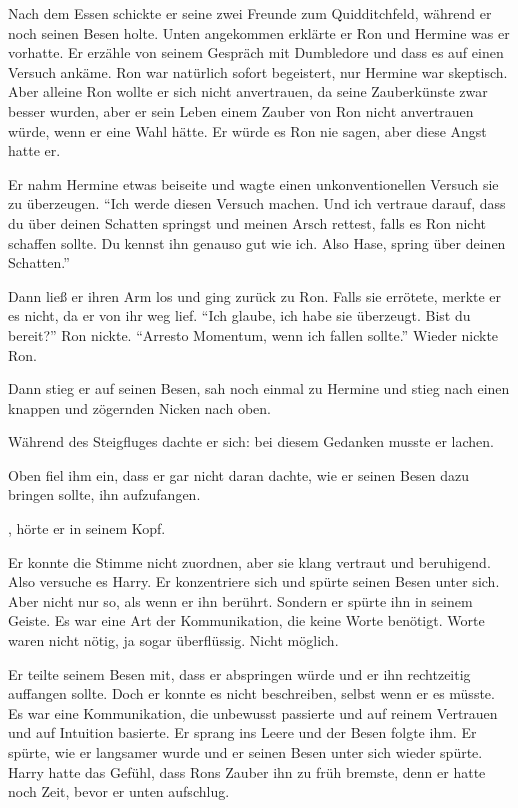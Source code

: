 Nach dem Essen schickte er seine zwei Freunde zum Quidditchfeld, während er noch seinen Besen holte. Unten angekommen erklärte er Ron und Hermine was er vorhatte. Er erzähle von seinem Gespräch mit Dumbledore und dass es auf einen Versuch ankäme. Ron war natürlich sofort begeistert, nur Hermine war skeptisch. Aber alleine Ron wollte er sich nicht anvertrauen, da seine Zauberkünste zwar besser wurden, aber er sein Leben einem Zauber von Ron nicht anvertrauen würde, wenn er eine Wahl hätte. Er würde es Ron nie sagen, aber diese Angst hatte er.

Er nahm Hermine etwas beiseite und wagte einen unkonventionellen Versuch sie zu überzeugen. \enquote{Ich werde diesen Versuch machen. Und ich vertraue darauf, dass du über deinen Schatten springst und meinen Arsch rettest, falls es Ron nicht schaffen sollte. Du kennst ihn genauso gut wie ich. Also Hase, spring über deinen Schatten.}

Dann ließ er ihren Arm los und ging zurück zu Ron. Falls sie errötete, merkte er es nicht, da er von ihr weg lief. \enquote{Ich glaube, ich habe sie überzeugt. Bist du bereit?} Ron nickte. \enquote{Arresto Momentum, wenn ich fallen sollte.} Wieder nickte Ron.

Dann stieg er auf seinen Besen, sah noch einmal zu Hermine und stieg nach einen knappen und zögernden Nicken nach oben.

Während des Steigfluges dachte er sich:  bei diesem Gedanken musste er lachen. 

Oben fiel ihm ein, dass er gar nicht daran dachte, wie er seinen Besen dazu bringen sollte, ihn aufzufangen.

, hörte er in seinem Kopf.

Er konnte die Stimme nicht zuordnen, aber sie klang vertraut und beruhigend. Also versuche es Harry. Er konzentriere sich und spürte seinen Besen unter sich. Aber nicht nur so, als wenn er ihn berührt. Sondern er spürte ihn in seinem Geiste. Es war eine Art der Kommunikation, die keine Worte benötigt. Worte waren nicht nötig, ja sogar überflüssig. Nicht möglich.

Er teilte seinem Besen mit, dass er abspringen würde und er ihn rechtzeitig auffangen sollte. Doch er konnte es nicht beschreiben, selbst wenn er es müsste. Es war eine Kommunikation, die unbewusst passierte und auf reinem Vertrauen und auf Intuition basierte. Er sprang ins Leere und der Besen folgte ihm. Er spürte, wie er langsamer wurde und er seinen Besen unter sich wieder spürte. Harry hatte das Gefühl, dass Rons Zauber ihn zu früh bremste, denn er hatte noch Zeit, bevor er unten aufschlug.

